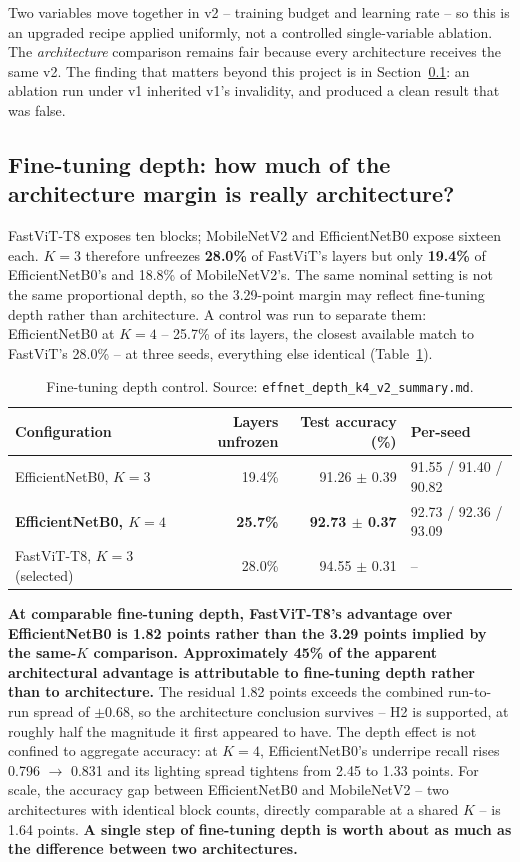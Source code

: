 \documentclass{article}
\begin{document}
Two variables move together in v2 -- training budget and learning rate -- so this is an upgraded recipe
applied uniformly, not a controlled single-variable ablation. The \textit{architecture} comparison remains
fair because every architecture receives the same v2. The finding that matters beyond this project is in
Section~\ref{sec:depth}: an ablation run under v1 inherited v1's invalidity, and produced a clean result
that was false.

\subsection{Fine-tuning depth: how much of the architecture margin is really architecture?}
\label{sec:depth}

FastViT-T8 exposes ten blocks; MobileNetV2 and EfficientNetB0 expose sixteen each. $K{=}3$ therefore
unfreezes \textbf{28.0\%} of FastViT's layers but only \textbf{19.4\%} of EfficientNetB0's and 18.8\% of
MobileNetV2's. The same nominal setting is not the same proportional depth, so the 3.29-point margin may
reflect fine-tuning depth rather than architecture. A control was run to separate them: EfficientNetB0 at
$K{=}4$ -- 25.7\% of its layers, the closest available match to FastViT's 28.0\% -- at three seeds,
everything else identical (Table~\ref{tab:depth}).

\begin{table}[t]
\centering
\caption{Fine-tuning depth control. Source: \texttt{effnet\_depth\_k4\_v2\_summary.md}.}
\label{tab:depth}
\begin{tabular}{@{}lrrl@{}}
\toprule
Configuration & Layers unfrozen & Test accuracy (\%) & Per-seed \\
\midrule
EfficientNetB0, $K{=}3$ & 19.4\% & 91.26 $\pm$ 0.39 & 91.55 / 91.40 / 90.82 \\
\textbf{EfficientNetB0, $K{=}4$} & \textbf{25.7\%} & \textbf{92.73 $\pm$ 0.37} & 92.73 / 92.36 / 93.09 \\
FastViT-T8, $K{=}3$ (selected) & 28.0\% & 94.55 $\pm$ 0.31 & -- \\
\bottomrule
\end{tabular}
\end{table}

\textbf{At comparable fine-tuning depth, FastViT-T8's advantage over EfficientNetB0 is 1.82 points rather
than the 3.29 points implied by the same-$K$ comparison. Approximately 45\% of the apparent architectural
advantage is attributable to fine-tuning depth rather than to architecture.} The residual 1.82 points
exceeds the combined run-to-run spread of $\pm$0.68, so the architecture conclusion survives -- H2 is
supported, at roughly half the magnitude it first appeared to have. The depth effect is not confined to
aggregate accuracy: at $K{=}4$, EfficientNetB0's underripe recall rises 0.796 $\rightarrow$ 0.831 and its
lighting spread tightens from 2.45 to 1.33 points. For scale, the accuracy gap between EfficientNetB0 and
MobileNetV2 -- two architectures with identical block counts, directly comparable at a shared $K$ -- is
1.64 points. \textbf{A single step of fine-tuning depth is worth about as much as the difference between
two architectures.}
\end{document}
